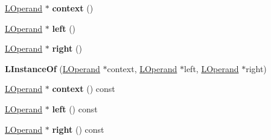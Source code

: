 \begin{DoxyCompactItemize}
\item 
\hyperlink{classv8_1_1internal_1_1_l_operand}{L\+Operand} $\ast$ {\bfseries context} ()\hypertarget{classv8_1_1internal_1_1_l_instance_of_a8545dac6b1d8f5c99b4e02718f87e9d9}{}\label{classv8_1_1internal_1_1_l_instance_of_a8545dac6b1d8f5c99b4e02718f87e9d9}

\item 
\hyperlink{classv8_1_1internal_1_1_l_operand}{L\+Operand} $\ast$ {\bfseries left} ()\hypertarget{classv8_1_1internal_1_1_l_instance_of_a8b04b520edb477c897999d23fed2614c}{}\label{classv8_1_1internal_1_1_l_instance_of_a8b04b520edb477c897999d23fed2614c}

\item 
\hyperlink{classv8_1_1internal_1_1_l_operand}{L\+Operand} $\ast$ {\bfseries right} ()\hypertarget{classv8_1_1internal_1_1_l_instance_of_aa11c91a1c4d5c3163c733a0be2a44d36}{}\label{classv8_1_1internal_1_1_l_instance_of_aa11c91a1c4d5c3163c733a0be2a44d36}

\item 
{\bfseries L\+Instance\+Of} (\hyperlink{classv8_1_1internal_1_1_l_operand}{L\+Operand} $\ast$context, \hyperlink{classv8_1_1internal_1_1_l_operand}{L\+Operand} $\ast$left, \hyperlink{classv8_1_1internal_1_1_l_operand}{L\+Operand} $\ast$right)\hypertarget{classv8_1_1internal_1_1_l_instance_of_a8ad0d7b134a9a55d1a38cb1fdfa5c885}{}\label{classv8_1_1internal_1_1_l_instance_of_a8ad0d7b134a9a55d1a38cb1fdfa5c885}

\item 
\hyperlink{classv8_1_1internal_1_1_l_operand}{L\+Operand} $\ast$ {\bfseries context} () const \hypertarget{classv8_1_1internal_1_1_l_instance_of_a1b27b2320dde2f64e3530dc627908888}{}\label{classv8_1_1internal_1_1_l_instance_of_a1b27b2320dde2f64e3530dc627908888}

\item 
\hyperlink{classv8_1_1internal_1_1_l_operand}{L\+Operand} $\ast$ {\bfseries left} () const \hypertarget{classv8_1_1internal_1_1_l_instance_of_a25d3b20c6819feb68c88a83a9f9d5399}{}\label{classv8_1_1internal_1_1_l_instance_of_a25d3b20c6819feb68c88a83a9f9d5399}

\item 
\hyperlink{classv8_1_1internal_1_1_l_operand}{L\+Operand} $\ast$ {\bfseries right} () const \hypertarget{classv8_1_1internal_1_1_l_instance_of_aa76d8ac6252398fda6be50e6458cbe9d}{}\label{classv8_1_1internal_1_1_l_instance_of_aa76d8ac6252398fda6be50e6458cbe9d}

\end{DoxyCompactItemize}
